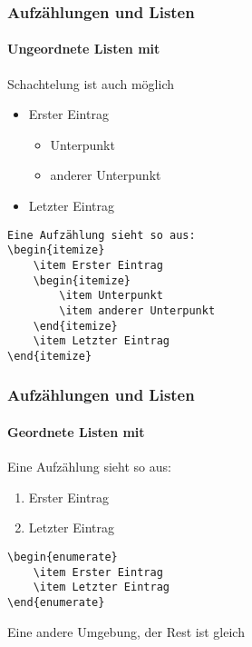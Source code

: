 \begin{frame}[fragile]
    \frametitle{Aufzählungen und Listen}
    \framesubtitle{Ungeordnete Listen mit }
    
    Schachtelung ist auch möglich
    \begin{itemize}
        \item Erster Eintrag
        \begin{itemize}
            \item Unterpunkt
            \item anderer Unterpunkt
        \end{itemize}
        \item Letzter Eintrag
    \end{itemize}
    
    \smallskip\pause
    \begin{verbatim}
Eine Aufzählung sieht so aus:
\begin{itemize}
    \item Erster Eintrag
    \begin{itemize}
        \item Unterpunkt
        \item anderer Unterpunkt
    \end{itemize}
    \item Letzter Eintrag
\end{itemize}
    \end{verbatim}
\end{frame}


\begin{frame}[fragile]
    \frametitle{Aufzählungen und Listen}
    \framesubtitle{Geordnete Listen mit }
    
    Eine Aufzählung sieht so aus:
    \begin{enumerate}
        \item Erster Eintrag
        \item Letzter Eintrag
    \end{enumerate}
    
    \medskip\pause
\begin{codeblock}
    \begin{verbatim}
\begin{enumerate}
    \item Erster Eintrag
    \item Letzter Eintrag
\end{enumerate}
\end{verbatim}
\end{codeblock}
    \medskip
    
    Eine andere Umgebung, der Rest ist gleich
\end{frame}


